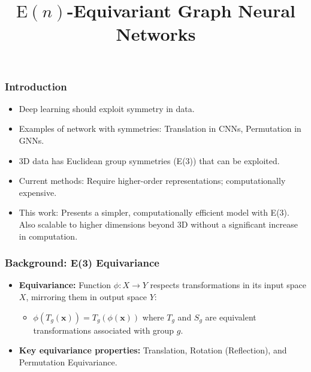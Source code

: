 \documentclass[11pt,xcolor={dvipsnames},hyperref={pdftex,pdfpagemode=UseNone,hidelinks,pdfdisplaydoctitle=true},usepdftitle=false]{beamer}
\newcommand{\rmx}{\mathbf{x}}
\newcommand{\En}{\mathrm{E}(n)}
\begin{document}
\title{$\En$-Equivariant \newline Graph Neural Networks}
%
\frame{\titlepage}



\begin{frame}
\frametitle{Introduction}
\begin{itemize}
    \item Deep learning should exploit symmetry in data.
    \item Examples of network with symmetries: Translation in CNNs, Permutation in GNNs.
    \item 3D data has Euclidean group symmetries (E(3)) that can be exploited.
    \item Current methods: Require higher-order representations; computationally expensive.
    \item This work: Presents a simpler, computationally efficient model with E(3). Also scalable to higher dimensions beyond 3D without a significant increase in computation.
\end{itemize}
\end{frame}

\begin{frame}
\frametitle{Background: E(3) Equivariance}
\begin{itemize}
      \item \textbf{Equivariance:} Function $\phi: X \to Y$ respects transformations in its input space $X$, mirroring them in output space $Y$: \begin{itemize}
      \item $\phi(T_g(\rmx)) = T_g(\phi(\rmx))$ where $T_g$ and $S_g$ are equivalent transformations associated with group $g$.\end{itemize}
      \item \textbf{Key equivariance properties:} Translation, Rotation (Reflection), and Permutation Equivariance.

\end{itemize}
\end{frame}
\end{document}
